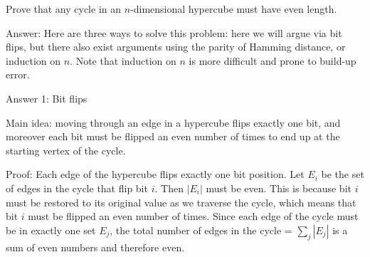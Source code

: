 \question Prove that any cycle in an $n$-dimensional hypercube must 
have even length.
\begin{solution}[.5in]
Answer: Here are three ways to solve this problem: here we will argue 
via bit flips, but there also exist arguments using the parity of 
Hamming distance, or induction on $n$. Note that induction on $n$ 
is more difficult and prone to build-up error.
					
Answer 1: Bit flips
					
Main idea: moving through an edge in a hypercube flips exactly one 
bit, and moreover each bit must be flipped an even number of times 
to end up at the starting vertex of the cycle.
					
Proof: Each edge of the hypercube flips exactly one bit position. 
Let $E_i$ be the set of edges in the cycle that flip bit $i$. Then 
$|E_i|$ must be even. This is because bit $i$ must be restored to 
its original value as we traverse the cycle, which means that bit 
$i$ must be flipped an even number of times. Since each edge of the 
cycle must be in exactly one set $E_j$, the total number of edges in 
the cycle = $\sum_j |E_j|$ is a sum of even numbers and therefore even. 
				
\end{solution}
